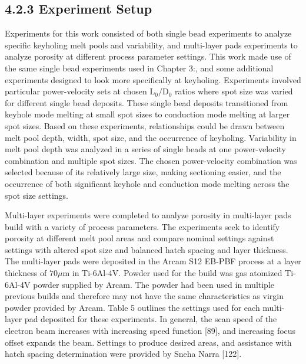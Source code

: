 \documentclass[10pt]{article}
\begin{document}
\subsection*{4.2.3 Experiment Setup}
Experiments for this work consisted of both single bead experiments to analyze specific keyholing melt pools and variability, and multi-layer pads experiments to analyze porosity at different process parameter settings. This work made use of the same single bead experiments used in Chapter 3:, and some additional experiments designed to look more specifically at keyholing. Experiments involved particular power-velocity sets at chosen $\mathrm{L}_{0} / \mathrm{D}_{0}$ ratios where spot size was varied for different single bead deposits. These single bead deposits transitioned from keyhole mode melting at small spot sizes to conduction mode melting at larger spot sizes. Based on these experiments, relationships could be drawn between melt pool depth, width, spot size, and the occurrence of keyholing. Variability in melt pool depth was analyzed in a series of single beads at one power-velocity combination and multiple spot sizes. The chosen power-velocity combination was selected because of its relatively large size, making sectioning easier, and the occurrence of both significant keyhole and conduction mode melting across the spot size settings.

Multi-layer experiments were completed to analyze porosity in multi-layer pads build with a variety of process parameters. The experiments seek to identify porosity at different melt pool areas and compare nominal settings against settings with altered spot size and balanced hatch spacing and layer thickness. The multi-layer pads were deposited in the Arcam S12 EB-PBF process at a layer thickness of $70 \mu \mathrm{m}$ in Ti-6Al-4V. Powder used for the build was gas atomized Ti-6Al-4V powder supplied by Arcam. The powder had been used in multiple previous builds and therefore may not have the same characteristics as virgin powder provided by Arcam. Table 5 outlines the settings used for each multi-layer pad deposited for these experiments. In general, the scan speed of the electron beam increases with increasing speed function [89], and increasing focus offset expands the beam. Settings to produce desired areas, and assistance with hatch spacing determination were provided by Sneha Narra [122].
\end{document}
